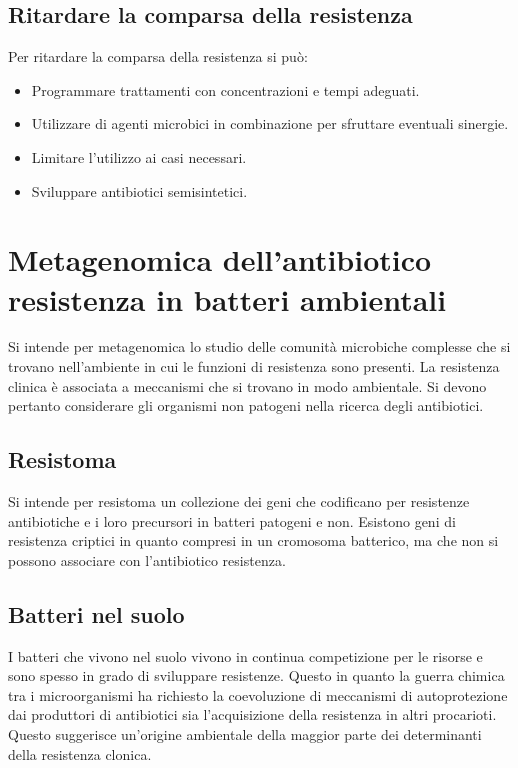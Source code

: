 	\subsection{Ritardare la comparsa della resistenza}
	Per ritardare la comparsa della resistenza si pu\`o:
	\begin{multicols}{2}
		\begin{itemize}
			\item Programmare trattamenti con concentrazioni e tempi adeguati.
			\item Utilizzare di agenti microbici in combinazione per sfruttare eventuali sinergie.
			\item Limitare l'utilizzo ai casi necessari.
			\item Sviluppare antibiotici semisintetici.
		\end{itemize}
	\end{multicols}

\section{Metagenomica dell'antibiotico resistenza in batteri ambientali}
Si intende per metagenomica lo studio delle comunit\`a microbiche complesse che si trovano nell'ambiente in cui le funzioni di resistenza sono presenti.
La resistenza clinica \`e associata a meccanismi che si trovano in modo ambientale.
Si devono pertanto considerare gli organismi non patogeni nella ricerca degli antibiotici.

	\subsection{Resistoma}
	Si intende per resistoma un collezione dei geni che codificano per resistenze antibiotiche e i loro precursori in batteri patogeni e non.
	Esistono geni di resistenza criptici in quanto compresi in un cromosoma batterico, ma che non si possono associare con l'antibiotico resistenza.

	\subsection{Batteri nel suolo}
	I batteri che vivono nel suolo vivono in continua competizione per le risorse e sono spesso in grado di sviluppare resistenze.
	Questo in quanto la guerra chimica tra i microorganismi ha richiesto la coevoluzione di meccanismi di autoprotezione dai produttori di antibiotici sia l'acquisizione della resistenza in altri procarioti.
	Questo suggerisce un'origine ambientale della maggior parte dei determinanti della resistenza clonica.

